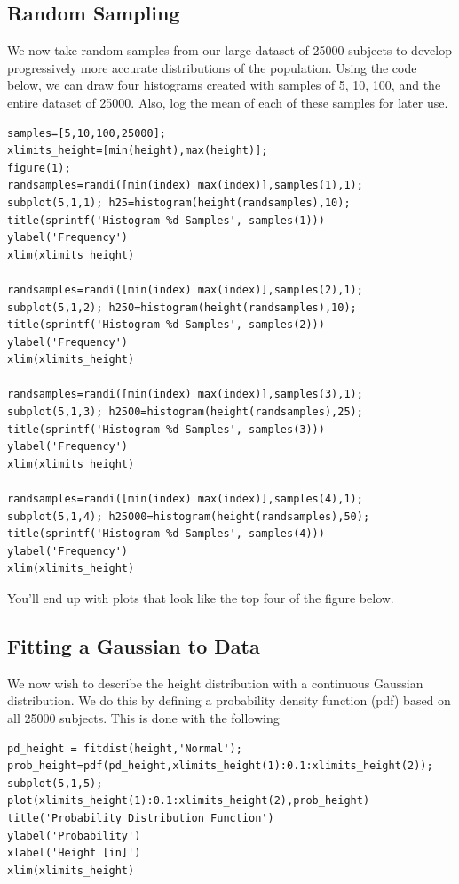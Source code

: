 \documentclass[12pt]{article}
\begin{document}
\subsection{Random Sampling}
We now take random samples from our large dataset of 25000 subjects to develop progressively more accurate distributions of the population. Using the code below, we can draw four histograms created with samples of 5, 10, 100, and the entire dataset of 25000. Also, log the mean of each of these samples for later use. 

\begin{lstlisting}[frame=single]
%% Random Sampling of Gaussian - Heights
samples=[5,10,100,25000];
xlimits_height=[min(height),max(height)];
figure(1);
randsamples=randi([min(index) max(index)],samples(1),1);
subplot(5,1,1); h25=histogram(height(randsamples),10);
title(sprintf('Histogram %d Samples', samples(1)))
ylabel('Frequency')
xlim(xlimits_height)

randsamples=randi([min(index) max(index)],samples(2),1);
subplot(5,1,2); h250=histogram(height(randsamples),10);
title(sprintf('Histogram %d Samples', samples(2)))
ylabel('Frequency')
xlim(xlimits_height)

randsamples=randi([min(index) max(index)],samples(3),1);
subplot(5,1,3); h2500=histogram(height(randsamples),25);
title(sprintf('Histogram %d Samples', samples(3)))
ylabel('Frequency')
xlim(xlimits_height)

randsamples=randi([min(index) max(index)],samples(4),1);
subplot(5,1,4); h25000=histogram(height(randsamples),50);
title(sprintf('Histogram %d Samples', samples(4)))
ylabel('Frequency')
xlim(xlimits_height)
\end{lstlisting}

You'll end up with plots that look like the top four of the figure below. 

\subsection{Fitting a Gaussian to Data}
We now wish to describe the height distribution with a continuous Gaussian distribution. We do this by defining a probability density function (pdf) based on all 25000 subjects. This is done with the following

\begin{lstlisting}[frame=single]
%% fit gaussian to data
pd_height = fitdist(height,'Normal');
prob_height=pdf(pd_height,xlimits_height(1):0.1:xlimits_height(2));
subplot(5,1,5); plot(xlimits_height(1):0.1:xlimits_height(2),prob_height)
title('Probability Distribution Function')
ylabel('Probability')
xlabel('Height [in]')
xlim(xlimits_height)
\end{lstlisting}
\end{document}
